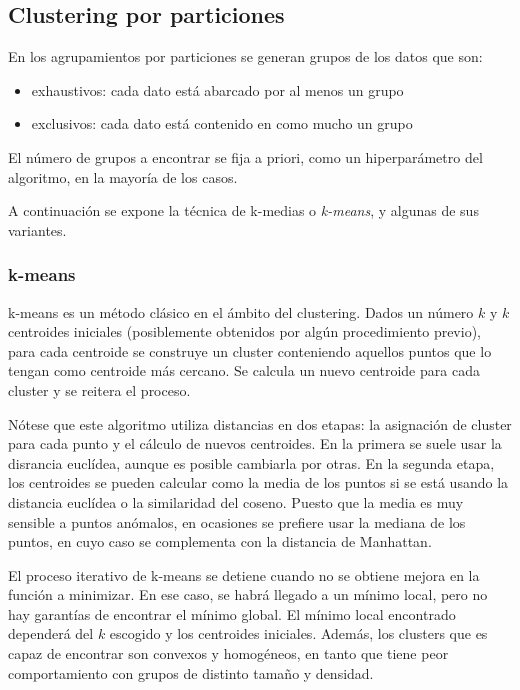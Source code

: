 \documentclass[a4paper,11pt,spanish]{report}
\let\stdsub\subsection
\let\stdsubsub\subsubsection
\renewcommand{\section}{\stdsub}
\renewcommand{\subsection}{\stdsubsub}
\begin{document}
\section{Clustering por particiones}
\label{sec-1-3-1}

En los agrupamientos por particiones se generan grupos de los datos que son:
\begin{itemize}
\item exhaustivos: cada dato está abarcado por al menos un grupo
\item exclusivos: cada dato está contenido en como mucho un grupo
\end{itemize}

El número de grupos a encontrar se fija a priori, como un hiperparámetro del algoritmo, en la mayoría de los casos.

A continuación se expone la técnica de k-medias o \emph{k-means}, y algunas de sus variantes.

\subsection*{k-means}
\label{sec-1-3-1-1}
k-means es un método clásico en el ámbito del clustering. Dados un número $k$ y $k$ centroides iniciales (posiblemente obtenidos por algún procedimiento previo), para cada centroide se construye un cluster conteniendo aquellos puntos que lo tengan como centroide más cercano. Se calcula un nuevo centroide para cada cluster y se reitera el proceso.

Nótese que este algoritmo utiliza distancias en dos etapas: la asignación de cluster para cada punto y el cálculo de nuevos centroides. En la primera se suele usar la disrancia euclídea, aunque es posible cambiarla por otras. En la segunda etapa, los centroides se pueden calcular como la media de los puntos si se está usando la distancia euclídea o la similaridad del coseno. Puesto que la media es muy sensible a puntos anómalos, en ocasiones se prefiere usar la mediana de los puntos, en cuyo caso se complementa con la distancia de Manhattan.

El proceso iterativo de k-means se detiene cuando no se obtiene mejora en la función a minimizar. En ese caso, se habrá llegado a un mínimo local, pero no hay garantías de encontrar el mínimo global. El mínimo local encontrado dependerá del $k$ escogido y los centroides iniciales. Además, los clusters que es capaz de encontrar son convexos y homogéneos, en tanto que tiene peor comportamiento con grupos de distinto tamaño y densidad.
\end{document}
